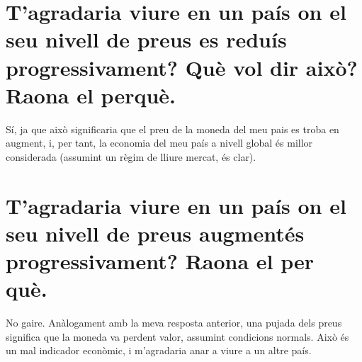 \section{
  T’agradaria viure en un país on el seu nivell de preus es reduís
  progressivament? Què vol dir això? Raona el perquè.
}

Sí, ja que això significaria que el preu de la moneda del meu pais es troba 
en augment, i, per tant, la economia del meu país a nivell global és
millor considerada (assumint un règim de lliure mercat, és clar).

\section*{
  T’agradaria viure en un país on el seu nivell de preus augmentés
  progressivament? Raona el per què.
}

No gaire. Anàlogament amb la meva resposta anterior, una pujada dels preus
significa que la moneda va perdent valor, assumint condicions normals. Això
és un mal indicador econòmic, i m'agradaria anar a viure a un altre país.

